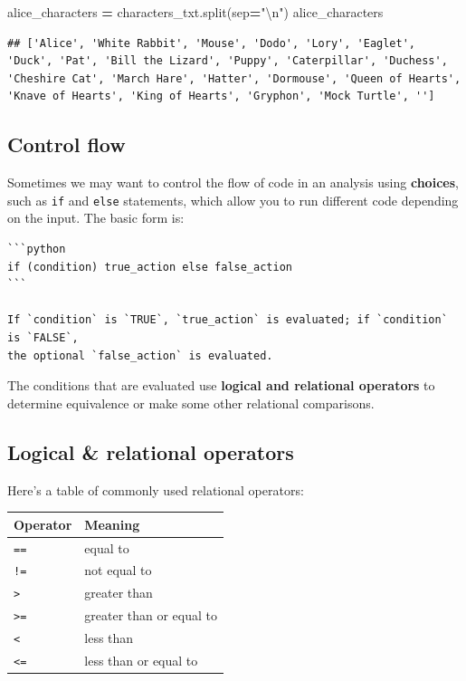 \documentclass[]{book}
\newenvironment{Shaded}{\begin{snugshade}}{\end{snugshade}}
\newcommand{\CharTok}[1]{\textcolor[rgb]{0.31,0.60,0.02}{#1}}
\newcommand{\NormalTok}[1]{#1}
\newcommand{\OperatorTok}[1]{\textcolor[rgb]{0.81,0.36,0.00}{\textbf{#1}}}
\newcommand{\StringTok}[1]{\textcolor[rgb]{0.31,0.60,0.02}{#1}}
\begin{document}
\begin{Shaded}
\begin{Highlighting}[]
\NormalTok{alice_characters }\OperatorTok{=}\NormalTok{ characters_txt.split(sep}\OperatorTok{=}\StringTok{"}\CharTok{\textbackslash{}n}\StringTok{"}\NormalTok{)}
\NormalTok{alice_characters}
\end{Highlighting}
\end{Shaded}

\begin{verbatim}
## ['Alice', 'White Rabbit', 'Mouse', 'Dodo', 'Lory', 'Eaglet', 'Duck', 'Pat', 'Bill the Lizard', 'Puppy', 'Caterpillar', 'Duchess', 'Cheshire Cat', 'March Hare', 'Hatter', 'Dormouse', 'Queen of Hearts', 'Knave of Hearts', 'King of Hearts', 'Gryphon', 'Mock Turtle', '']
\end{verbatim}

\hypertarget{control-flow}{%
\subsection{Control flow}\label{control-flow}}

Sometimes we may want to control the flow of code in an analysis using \textbf{choices},
such as \texttt{if} and \texttt{else} statements, which allow you to run different code depending on the input.
The basic form is:

\begin{verbatim}
```python
if (condition) true_action else false_action
```

If `condition` is `TRUE`, `true_action` is evaluated; if `condition` is `FALSE`,
the optional `false_action` is evaluated.
\end{verbatim}

The conditions that are evaluated use \textbf{logical and relational operators} to determine equivalence or make some other relational comparisons.

\hypertarget{logical-relational-operators-1}{%
\subsection{Logical \& relational operators}\label{logical-relational-operators-1}}

Here's a table of commonly used relational operators:

\begin{longtable}[]{@{}ll@{}}
\toprule
Operator & Meaning\tabularnewline
\midrule
\endhead
\texttt{==} & equal to\tabularnewline
\texttt{!=} & not equal to\tabularnewline
\texttt{\textgreater{}} & greater than\tabularnewline
\texttt{\textgreater{}=} & greater than or equal to\tabularnewline
\texttt{\textless{}} & less than\tabularnewline
\texttt{\textless{}=} & less than or equal to\tabularnewline
\bottomrule
\end{longtable}
\end{document}
